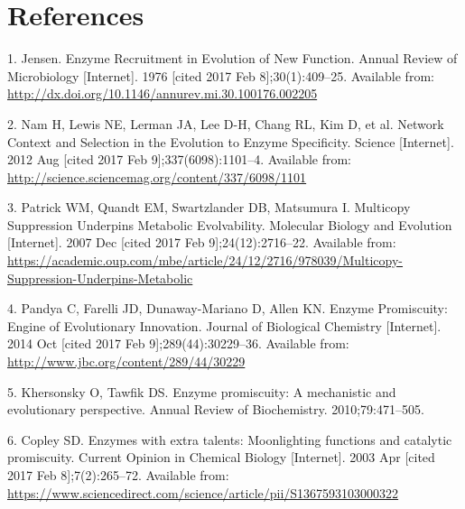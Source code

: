 \documentclass[12pt,twoside]{reedthesis}
\begin{document}
  \backmatter
  
  \chapter{References}\label{references}
  
  \noindent
  
  \setlength{\parindent}{-0.20in} \setlength{\leftskip}{0.20in}
  \setlength{\parskip}{8pt}
  
  \hypertarget{refs}{}
  \hypertarget{ref-jensen_enzyme_1976}{}
  1. Jensen. Enzyme Recruitment in Evolution of New Function. Annual
  Review of Microbiology {[}Internet{]}. 1976 {[}cited 2017 Feb
  8{]};30(1):409--25. Available from:
  \url{http://dx.doi.org/10.1146/annurev.mi.30.100176.002205}
  
  \hypertarget{ref-nam_network_2012}{}
  2. Nam H, Lewis NE, Lerman JA, Lee D-H, Chang RL, Kim D, et al. Network
  Context and Selection in the Evolution to Enzyme Specificity. Science
  {[}Internet{]}. 2012 Aug {[}cited 2017 Feb 9{]};337(6098):1101--4.
  Available from:
  \url{http://science.sciencemag.org/content/337/6098/1101}
  
  \hypertarget{ref-patrick_multicopy_2007}{}
  3. Patrick WM, Quandt EM, Swartzlander DB, Matsumura I. Multicopy
  Suppression Underpins Metabolic Evolvability. Molecular Biology and
  Evolution {[}Internet{]}. 2007 Dec {[}cited 2017 Feb
  9{]};24(12):2716--22. Available from:
  \url{https://academic.oup.com/mbe/article/24/12/2716/978039/Multicopy-Suppression-Underpins-Metabolic}
  
  \hypertarget{ref-pandya_enzyme_2014}{}
  4. Pandya C, Farelli JD, Dunaway-Mariano D, Allen KN. Enzyme
  Promiscuity: Engine of Evolutionary Innovation. Journal of Biological
  Chemistry {[}Internet{]}. 2014 Oct {[}cited 2017 Feb
  9{]};289(44):30229--36. Available from:
  \url{http://www.jbc.org/content/289/44/30229}
  
  \hypertarget{ref-khersonsky_enzyme_2010}{}
  5. Khersonsky O, Tawfik DS. Enzyme promiscuity: A mechanistic and
  evolutionary perspective. Annual Review of Biochemistry.
  2010;79:471--505.
  
  \hypertarget{ref-copley_enzymes_2003}{}
  6. Copley SD. Enzymes with extra talents: Moonlighting functions and
  catalytic promiscuity. Current Opinion in Chemical Biology
  {[}Internet{]}. 2003 Apr {[}cited 2017 Feb 8{]};7(2):265--72. Available
  from:
  \url{https://www.sciencedirect.com/science/article/pii/S1367593103000322}
  
\end{document}
